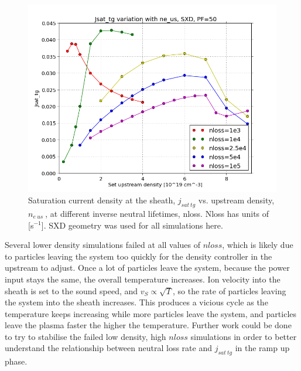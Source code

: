 \documentclass[12pt]{article}  %
\providecommand{\pow}[1]{{$^{#1}$}} %
\providecommand{\neus}{$n_{e~us}~$} %
\begin{document}
\begin{figure}
\includegraphics[scale=0.6]{Figures/sol1d/nloss1e345,525e425_2.png}
\centering
\caption{Saturation current density at the sheath, $j_{sat~tg}$ vs. upstream density, \neus, at different inverse neutral lifetimes, nloss. Nloss has units of [s\pow{-1}]. SXD geometry was used for all simulations here.}\label{fignloss1e345,52.5e425_2}
\end{figure}

Several lower density simulations failed at all values of $nloss$, which is likely due to particles leaving the system too quickly for the density controller in the upstream to adjust. Once a lot of particles leave the system, because the power input stays the same, the overall temperature increases. Ion velocity into the sheath is set to the sound speed, and $v_S \propto \sqrt{T}$, so the rate of particles leaving the system into the sheath increases. This produces a vicious cycle as the temperature keeps increasing while more particles leave the system, and particles leave the plasma faster the higher the temperature. Further work could be done to try to stabilise the failed low density, high $nloss$ simulations in order to better understand the relationship between neutral loss rate and $j_{sat~tg}$ in the ramp up phase.
\end{document}
